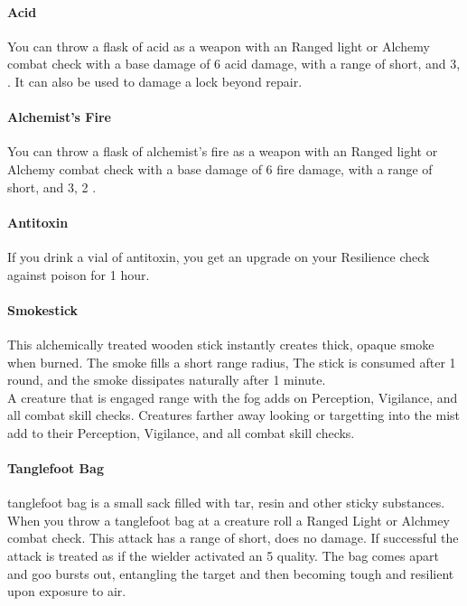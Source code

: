 \begin{multicols}{2}

\paragraph{Acid} \label{alcitm:acid}
You can throw a flask of acid as a weapon with an
Ranged light or Alchemy combat check with a base
damage of 6 acid damage, with a range of short, and
 3, .
It can also be used to damage a lock beyond repair.

\paragraph{Alchemist's Fire} \label{alcitm:alchemistsfire}
You can throw a flask of alchemist’s fire as a weapon
with an Ranged light or Alchemy combat check with
a base damage of 6 fire damage, with a range of short,
and  3,  2 .

\paragraph{Antitoxin} \label{alcitm:antitoxin}
If you drink a vial of antitoxin, you get an upgrade on
your Resilience check against poison for 1 hour.

\paragraph{Smokestick} \label{alcitm:smokestick}
This alchemically treated wooden stick instantly creates
thick, opaque smoke when burned. The smoke fills a
short range radius, The stick is consumed after 1 round,
and the smoke dissipates naturally after 1 minute.\\
A creature that is engaged range with the fog adds
\setback on Perception, Vigilance, and all combat skill
checks. Creatures farther away looking or targetting into
the mist add \setback\setback to their Perception, Vigilance,
and all combat skill checks.

\paragraph{Tanglefoot Bag} \label{alcitm:tanglefootbag}
tanglefoot bag is a small sack filled with tar, resin
and other sticky substances. When you throw a
tanglefoot bag at a creature roll a Ranged Light or
Alchmey combat check. This attack has a range of
short, does no damage. If successful the attack is treated
as if the wielder activated an  5 quality. The
bag comes apart and goo bursts out, entangling the
target and then becoming tough and resilient upon
exposure to air.


\end{multicols}
